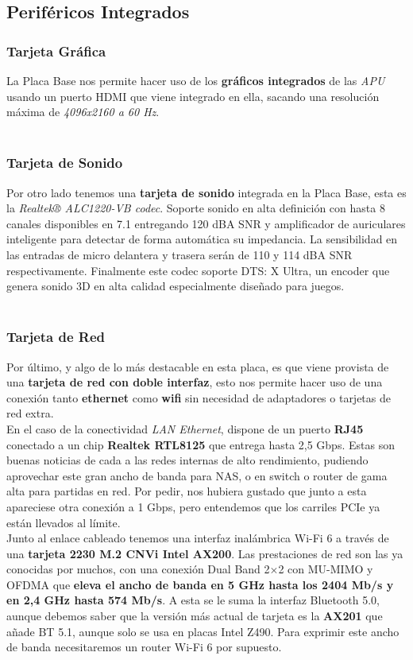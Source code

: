 \documentclass{article}
\begin{document}
    \subsection{Periféricos Integrados}
      \subsubsection{Tarjeta Gráfica}
        La Placa Base nos permite hacer uso de los \textbf{gráficos integrados} de las \textit{APU} usando un puerto HDMI que viene integrado en ella, sacando una resolución máxima de \textit{4096x2160 a 60 Hz}.
        \\\\
      \subsubsection{Tarjeta de Sonido}
        Por otro lado tenemos una \textbf{tarjeta de sonido} integrada en la Placa Base, esta es la \textit{Realtek® ALC1220-VB codec}.  Soporte sonido en alta definición con hasta 8 canales disponibles en 7.1 entregando 
        120 dBA SNR y amplificador de auriculares inteligente para detectar de forma automática su impedancia. La sensibilidad en las entradas de micro delantera y trasera serán de 110 y 114 dBA SNR respectivamente. 
        Finalmente este codec soporte DTS: X Ultra, un encoder que genera sonido 3D en alta calidad especialmente diseñado para juegos.
        \\\\
      \subsubsection{Tarjeta de Red}
        Por último, y algo de lo más destacable en esta placa, es que viene provista de una \textbf{tarjeta de red con doble interfaz}, esto nos permite hacer uso de una conexión tanto \textbf{ethernet} como \textbf{wifi} 
        sin necesidad de adaptadores o tarjetas de red extra.\\ En el caso de la conectividad \textit{LAN Ethernet}, dispone de un puerto \textbf{RJ45} conectado a un chip \textbf{Realtek RTL8125} que entrega hasta 2,5 Gbps. 
        Estas son buenas noticias de cada a las redes internas de alto rendimiento, pudiendo aprovechar este gran ancho de banda para NAS, o en switch o router de gama alta para partidas en red. Por pedir, nos hubiera gustado 
        que junto a esta apareciese otra conexión a 1 Gbps, pero entendemos que los carriles PCIe ya están llevados al límite.
        \\
        Junto al enlace cableado tenemos una interfaz inalámbrica Wi-Fi 6 a través de una \textbf{tarjeta 2230 M.2 CNVi Intel AX200}. Las prestaciones de red son las ya conocidas por muchos, con una conexión Dual Band 2×2 con MU-MIMO 
        y OFDMA que \textbf{eleva el ancho de banda en 5 GHz hasta los 2404 Mb/s y en 2,4 GHz hasta 574 Mb/s}. A esta se le suma la interfaz Bluetooth 5.0, aunque debemos saber que la versión más actual de tarjeta es la \textbf{AX201} 
        que añade BT 5.1, aunque solo se usa en placas Intel Z490. Para exprimir este ancho de banda necesitaremos un router Wi-Fi 6 por supuesto.
      
\end{document}
